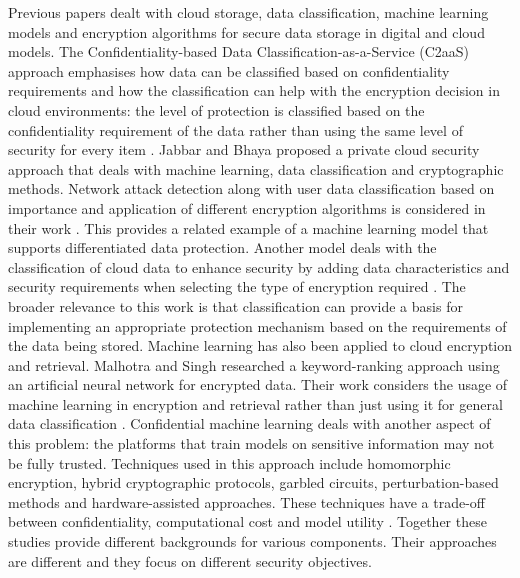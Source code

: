 \documentclass[pdflatex,sn-mathphys-num]{sn-jnl}
\begin{document}
Previous papers dealt with cloud storage, data classification, machine learning models and
encryption algorithms for secure data storage in digital and cloud models. The
Confidentiality-based Data Classification-as-a-Service (C2aaS) approach emphasises how data can be
classified based on confidentiality requirements and how the classification can help with the
encryption decision in cloud environments: the level of protection is classified based on the
confidentiality requirement of the data rather than using the same level of security for every
item \cite{ali2023confidentiality}. Jabbar and Bhaya proposed a private cloud security approach
that deals with machine learning, data classification and cryptographic methods. Network attack
detection along with user data classification based on importance and application of different
encryption algorithms is considered in their work \cite{jabbar2022secure}. This provides a related
example of a machine learning model that supports differentiated data protection. Another model
deals with the classification of cloud data to enhance security by adding data characteristics and
security requirements when selecting the type of encryption required
\cite{singh2018classification}. The broader relevance to this work is that classification can
provide a basis for implementing an appropriate protection mechanism based on the requirements of
the data being stored. Machine learning has also been applied to cloud encryption and retrieval.
Malhotra and Singh researched a keyword-ranking approach using an artificial neural network for
encrypted data. Their work considers the usage of machine learning in encryption and retrieval
rather than just using it for general data classification \cite{malhotra2023efficacy}.
Confidential machine learning deals with another aspect of this problem: the platforms that train
models on sensitive information may not be fully trusted. Techniques used in this approach include
homomorphic encryption, hybrid cryptographic protocols, garbled circuits, perturbation-based
methods and hardware-assisted approaches. These techniques have a trade-off between
confidentiality, computational cost and model utility \cite{sagar2021confidential}. Together these
studies provide different backgrounds for various components. Their approaches are different and
they focus on different security objectives.
\end{document}
